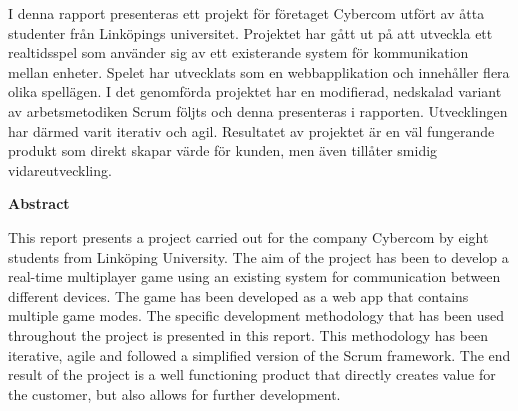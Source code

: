 {\justify
I denna rapport presenteras ett projekt för företaget Cybercom utfört av åtta studenter från Linköpings universitet. Projektet har gått ut på att utveckla ett realtidsspel som använder sig av ett existerande system för kommunikation mellan enheter. Spelet har utvecklats som en webbapplikation och innehåller flera olika spellägen. I det genomförda projektet har en modifierad, nedskalad variant av arbetsmetodiken Scrum följts och denna presenteras i rapporten. Utvecklingen har därmed varit iterativ och agil. Resultatet av projektet är en väl fungerande produkt som direkt skapar värde för kunden, men även tillåter smidig vidareutveckling.\\[1in]\par
}
{\centering
  \indent\textbf{Abstract}\par
}
This report presents a project carried out for the company Cybercom by eight students from Linköping University. The aim of the project has been to develop a real-time multiplayer game using an existing system for communication between different devices. The game has been developed as a web app that contains multiple game modes. The specific development methodology that has been used throughout the project is presented in this report. This methodology has been iterative, agile and followed a simplified version of the Scrum framework. The end result of the project is a well functioning product that directly creates value for the customer, but also allows for further development.
